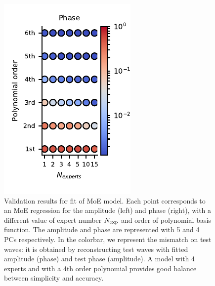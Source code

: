 \documentclass[twocolumn,showpacs,preprintnumbers,nofootinbib,prd,
superscriptaddress,10pt]{revtex4-1}
\begin{document}
\begin{figure}[!t]
\begin{minipage}{.5\linewidth}
    \end{minipage}\hfill
    \begin{minipage}{.5\linewidth}
        \centering
        \includegraphics[width=\linewidth]{img/MoE_mismatch_ph.pdf}
    \end{minipage}
	\caption{Validation results for fit of MoE model. Each point corresponds to an MoE regression for the amplitude (left) and phase (right), with a different value of expert number $N_{\rm exp}$ and order of polynomial basis function.
The amplitude and phase are represented with 5 and 4 PCs respectively.
In the colorbar, we represent the mismatch on test waves: it is obtained by reconstructing test waves with fitted amplitude (phase) and test phase (amplitude).
A model with 4 experts and with a 4th order polynomial provides good balance between simplicity and accuracy.
}
	\label{fig:MoE_test}
\end{figure}
\end{document}
